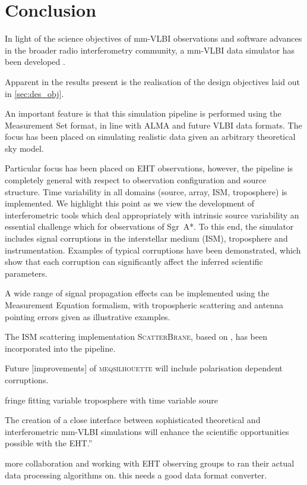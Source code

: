 \chapter{Conclusion} %

In light of the science objectives of mm-VLBI observations and software advances in the broader radio interferometry community, a mm-VLBI data simulator has been developed \citep{Blecher_2016}.

Apparent in the results present is the realisation of the design objectives laid out in \ref{sec:des_obj}.

An important feature is that this simulation pipeline is performed using the {\sc Measurement Set} format, in line with ALMA and future VLBI data formats. The focus has been placed on simulating realistic data given an arbitrary theoretical sky model. 


Particular focus has been placed on EHT observations, however, the pipeline is completely general with respect to observation configuration and source structure. 
Time variability in all domains (source, array, ISM, troposphere) is implemented. We highlight this point as we view the development of interferometric tools which deal appropriately with intrinsic source variability an essential challenge which for observations of Sgr~A*. 
To this end, the simulator includes signal corruptions in the interstellar medium (ISM), troposphere and instrumentation. Examples of typical corruptions have been demonstrated, which show that each corruption can significantly affect the inferred scientific parameters.

A wide range of signal propagation effects can be implemented using the Measurement Equation formalism, with tropospheric scattering and antenna pointing errors given as illustrative examples. 

The ISM scattering implementation \textsc{ScatterBrane}, based on \citet*{Johnson_2015a}, has been incorporated into the pipeline.
%

Future [improvements] of \textsc{meqsilhouette} will include polarisation dependent corruptions. 

fringe fitting variable troposphere with time variable soure

The creation of a close interface between sophisticated theoretical and interferometric mm-VLBI simulations will enhance the scientific opportunities possible with the EHT.''


more collaboration and working with EHT observing groups to ran their actual data processing algorithms on. this needs a good data format converter. 



